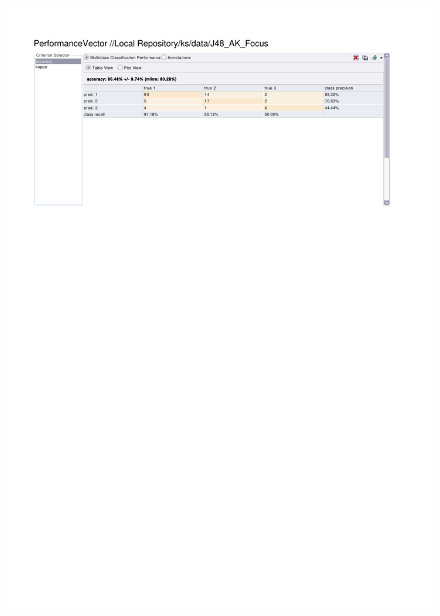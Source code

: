 \begin{figure}[htp]
  \centerline{\includegraphics[trim=0 683 0 60,clip,width=16.09cm]{results/J48_A_Focus.pdf}} \caption{
} \label{J48_K_Focus}
\end{figure}

